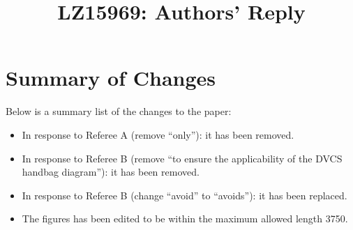 \documentclass{article}
\title{LZ15969:  Authors' Reply}
\begin{document}
\maketitle

\section{Summary of Changes}
Below is a summary list of the changes to the paper:  

\begin{itemize}
   \item{ In response to Referee A (remove ``only''): it has been removed.}
   \item{ In response to Referee B (remove ``to ensure
the applicability of the DVCS handbag diagram''): it has been removed.}
   \item{ In response to Referee B (change ``avoid'' to ``avoids''): it has 
      been replaced.}
   \item { The figures has been edited to be within the maximum allowed length 
      3750.}   

\end{itemize}
\end{document}

